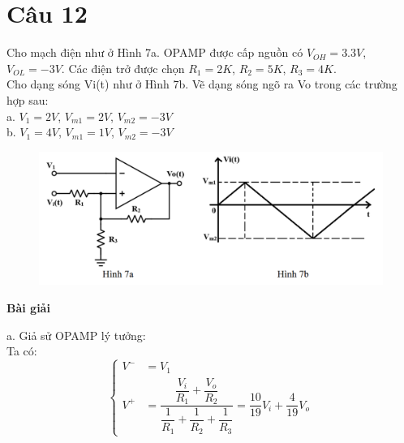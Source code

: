 \section{Câu 12}
Cho mạch điện như ở Hình 7a. OPAMP được cấp nguồn có $V_{OH}=3.3V$, $V_{OL}=-3V$.
Các điện trở được chọn $R_1=2K$, $R_2=5K$, $R_3=4K$.\\
Cho dạng sóng Vi(t) như ở Hình 7b. Vẽ dạng sóng ngõ ra Vo trong các trường hợp sau:\\
a. $V_1=2V$, $V_{m1}=2V$, $V_{m2}=-3V$\\
b. $V_1=4V$, $V_{m1}=1V$, $V_{m2}=-3V$
\begin{figure}[H]
	\centering
	\includegraphics[scale=0.6]{image/C12_De.png}
\end{figure}
\begin{center}
\textbf{Bài giải}
\end{center}
a. Giả sử OPAMP lý tưởng:\\
Ta có:
\[
\left\{
\begin{aligned}
V^- &= V_1 \\
V^+ &= \dfrac{\dfrac{V_i}{R_1} + \dfrac{V_o}{R_2}}{\dfrac{1}{R_1} + \dfrac{1}{R_2} + \dfrac{1}{R_3}} = \dfrac{10}{19}V_i +\dfrac{4}{19}V_o
\end{aligned}
\right.
\]

